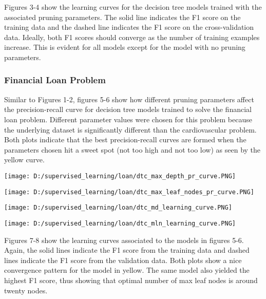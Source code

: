 \documentclass[10pt,journal,compsoc]{IEEEtran}
\begin{document}
Figures 3-4 show the learning curves for the decision tree models trained with the associated pruning parameters. The solid line indicates the F1 score on the training data and the dashed line indicates the F1 score on the cross-validation data. Ideally, both F1 scores should converge as the number of training examples increase. This is evident for all models except for the model with no pruning parameters.  

\subsubsection{Financial Loan Problem}
Similar to Figures 1-2, figures 5-6 show how different pruning parameters affect the precision-recall curve for decision tree models trained to solve the financial loan problem. Different parameter values were chosen for this problem because the underlying dataset is significantly different than the cardiovascular problem. Both plots indicate that the best precision-recall curves are formed when the parameters chosen hit a sweet spot (not too high and not too low) as seen by the yellow curve. 
\begin{center}
	\texttt{[image: D:/supervised\_learning/loan/dtc\_max\_depth\_pr\_curve.PNG]}
\end{center}
\begin{center}
	\texttt{[image: D:/supervised\_learning/loan/dtc\_max\_leaf\_nodes\_pr\_curve.PNG]}
\end{center}
\begin{center}
	\texttt{[image: D:/supervised\_learning/loan/dtc\_md\_learning\_curve.PNG]}
\end{center}
\begin{center}
	\texttt{[image: D:/supervised\_learning/loan/dtc\_mln\_learning\_curve.PNG]}
\end{center}

Figures 7-8 show the learning curves associated to the models in figures 5-6. Again, the solid lines indicate the F1 score from the training data and dashed lines indicate the F1 score from the validation data. Both plots show a nice convergence pattern for the model in yellow. The same model also yielded the highest F1 score, thus showing that optimal number of max leaf nodes is around twenty nodes.
\end{document}

